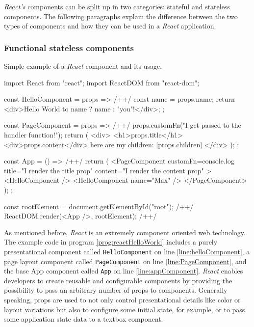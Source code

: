 \emph{React's} components can be split up in two categories: stateful and stateless components. The following paragraphs explain the difference between the two types of components and how they can be used in a \emph{React} application.

\subsubsection{Functional stateless components}

\begin{program}
\caption{Simple example of a \emph{React} component and its usage.} 
\label{prog:reactHelloWorld}
\begin{JsCode}
import React from "react";
import ReactDOM from "react-dom";

const HelloComponent = props => { /+\label{line:helloComponent}+/
  const name = props.name;
  return <div>Hello World to {name ? name : "you"}!</div>;
};

const PageComponent = props => { /+\label{line:PageComponent}+/
  props.customFn("I get passed to the handler function!");
  return (
    <div>
      <h1>{props.title}</h1>
      <div>{props.content}</div>
      here are my children: [{props.children}]
    </div>
  );
};

const App = () => { /+\label{line:appComponent}+/
  return (
    <PageComponent
      customFn={console.log}
      title="I render the title prop"
      content="I render the content prop"
    >
      <HelloComponent />
      <HelloComponent name={"Max"} />
    </PageComponent>
  );
};

const rootElement = document.getElementById("root"); /+\label{line:reactRoot}+/
ReactDOM.render(<App />, rootElement); /+\label{line:reactDomRender}+/
\end{JsCode}
\end{program}

As mentioned before, \emph{React} is an extremely component oriented web technology. The example code in program \ref{prog:reactHelloWorld} includes a purely presentational component called \texttt{Hello\-Component} on line \ref{line:helloComponent}, a page layout component called \texttt{PageComponent} on line \ref{line:PageComponent}, and the base App component called \texttt{App} on line \ref{line:appComponent}. \emph{React} enables developers to create reusable and configurable components by providing the possibility to pass an arbitrary number of props to components. Generally speaking, props are used to not only control presentational details like color or layout variations but also to configure some initial state, for example, or to pass some application state data to a textbox component.

